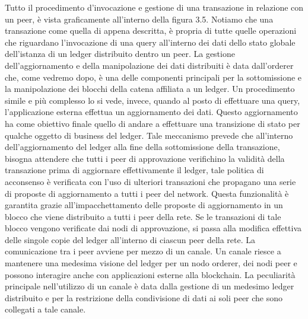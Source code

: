 Tutto il procedimento d'invocazione e gestione di una transazione in relazione con un peer, è vista graficamente all'interno della figura 3.5.
Notiamo che una transazione come quella di appena descritta, è propria di tutte quelle operazioni che riguardano l'invocazione di una query all'interno dei dati dello stato globale dell'istanza di un ledger distribuito dentro un peer. La gestione dell'aggiornamento e della manipolazione dei dati distribuiti è data dall'orderer che, come vedremo dopo, è una delle componenti principali per la sottomissione e la manipolazione dei blocchi della catena affiliata a un ledger. Un procedimento simile e più complesso lo si vede, invece, quando al posto di effettuare una query, l'applicazione esterna effettua un aggiornamento dei dati. Questo aggiornamento ha come obiettivo finale quello di andare a effettuare una transizione di stato per qualche oggetto di business del ledger. Tale meccanismo prevede che all'interno dell'aggiornamento del ledger alla fine della sottomissione della transazione, bisogna attendere che tutti i peer di approvazione verifichino la validità della transazione prima di aggiornare effettivamente il ledger, tale politica di acconsenso è verificata con l'uso di ulteriori transazioni che propagano una serie di proposte di aggiornamento a tutti i peer del network. Questa funzionalità è garantita grazie all'impacchettamento delle proposte di aggiornamento in un blocco che viene distribuito a tutti i peer della rete. Se le transazioni di tale blocco vengono verificate dai nodi di approvazione, si passa alla modifica effettiva delle singole copie del ledger all'interno di ciascun peer della rete.
La comunicazione tra i peer avviene per mezzo di un canale. Un canale riesce a mantenere una medesima visione del ledger per un nodo orderer, dei nodi peer e possono interagire anche con applicazioni esterne alla blockchain. La peculiarità principale nell'utilizzo di un canale è data dalla gestione di un medesimo ledger distribuito e per la restrizione della condivisione di dati ai soli peer che sono collegati a tale canale.


